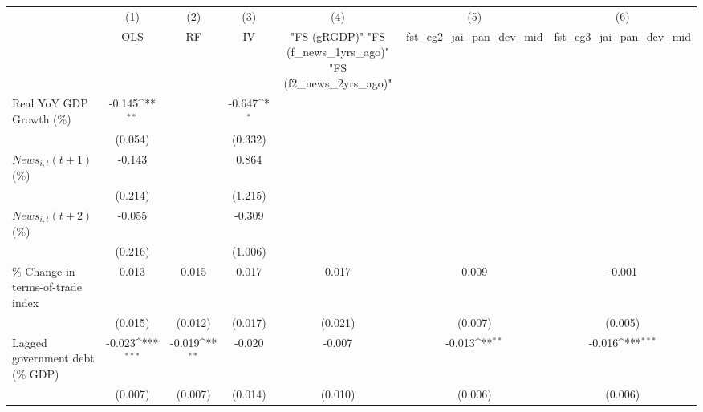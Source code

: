 {
\def\sym#1{\ifmmode^{#1}\else\(^{#1}\)\fi}
\begin{tabular}{l*{6}{c}}
\toprule
                    &\multicolumn{1}{c}{(1)}&\multicolumn{1}{c}{(2)}&\multicolumn{1}{c}{(3)}&\multicolumn{1}{c}{(4)}&\multicolumn{1}{c}{(5)}&\multicolumn{1}{c}{(6)}\\
                    &\multicolumn{1}{c}{OLS}&\multicolumn{1}{c}{RF}&\multicolumn{1}{c}{IV}&\multicolumn{1}{c}{ "FS (gRGDP)"  "FS (f_news_1yrs_ago)"  "FS (f2_news_2yrs_ago)" }&\multicolumn{1}{c}{fst_eg2_jai_pan_dev_mid}&\multicolumn{1}{c}{fst_eg3_jai_pan_dev_mid}\\
\midrule
Real YoY GDP Growth (\%)&      -0.145\sym{**} &                     &      -0.647\sym{*}  &                     &                     &                     \\
                    &     (0.054)         &                     &     (0.332)         &                     &                     &                     \\
\addlinespace
$ News_{i,t}(t+1)$ (\%)&      -0.143         &                     &       0.864         &                     &                     &                     \\
                    &     (0.214)         &                     &     (1.215)         &                     &                     &                     \\
\addlinespace
$ News_{i,t}(t+2)$ (\%)&      -0.055         &                     &      -0.309         &                     &                     &                     \\
                    &     (0.216)         &                     &     (1.006)         &                     &                     &                     \\
\addlinespace
\% Change in terms-of-trade index&       0.013         &       0.015         &       0.017         &       0.017         &       0.009         &      -0.001         \\
                    &     (0.015)         &     (0.012)         &     (0.017)         &     (0.021)         &     (0.007)         &     (0.005)         \\
\addlinespace
Lagged government debt (\% GDP)&      -0.023\sym{***}&      -0.019\sym{**} &      -0.020         &      -0.007         &      -0.013\sym{**} &      -0.016\sym{***}\\
                    &     (0.007)         &     (0.007)         &     (0.014)         &     (0.010)         &     (0.006)         &     (0.006)         \\

\end{tabular}}
